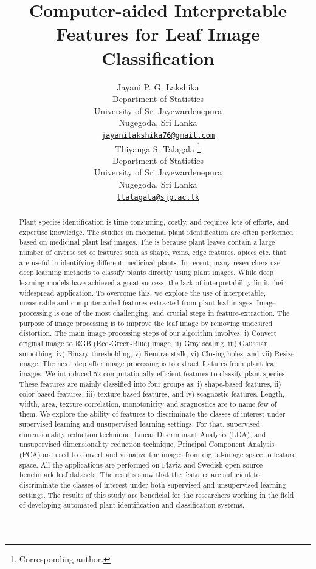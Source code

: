 \documentclass{article}
\title{Computer-aided Interpretable Features for Leaf Image
Classification}
\author{
    Jayani P. G. Lakshika
   \\
    Department of Statistics \\
    University of Sri Jayewardenepura \\
  Nugegoda, Sri Lanka \\
  \texttt{\href{mailto:jayanilakshika76@gmail.com}{\nolinkurl{jayanilakshika76@gmail.com}}} \\
   \And
    Thiyanga S. Talagala
    \thanks{Corresponding author.}
   \\
    Department of Statistics \\
    University of Sri Jayewardenepura \\
  Nugegoda, Sri Lanka \\
  \texttt{\href{mailto:ttalagala@sjp.ac.lk}{\nolinkurl{ttalagala@sjp.ac.lk}}} \\
  }
\begin{document}
\maketitle

\def\tightlist{}


\begin{abstract}
Plant species identification is time consuming, costly, and requires
lots of efforts, and expertise knowledge. The studies on medicinal plant
identification are often performed based on medicinal plant leaf images.
The is because plant leaves contain a large number of diverse set of
features such as shape, veins, edge features, apices etc. that are
useful in identifying different medicinal plants. In recent, many
researchers use deep learning methods to classify plants directly using
plant images. While deep learning models have achieved a great success,
the lack of interpretability limit their widespread application. To
overcome this, we explore the use of interpretable, measurable and
computer-aided features extracted from plant leaf images. Image
processing is one of the most challenging, and crucial steps in
feature-extraction. The purpose of image processing is to improve the
leaf image by removing undesired distortion. The main image processing
steps of our algorithm involves: i) Convert original image to RGB
(Red-Green-Blue) image, ii) Gray scaling, iii) Gaussian smoothing, iv)
Binary thresholding, v) Remove stalk, vi) Closing holes, and vii) Resize
image. The next step after image processing is to extract features from
plant leaf images. We introduced 52 computationally efficient features
to classify plant species. These features are mainly classified into
four groups as: i) shape-based features, ii) color-based features, iii)
texture-based features, and iv) scagnostic features. Length, width,
area, texture correlation, monotonicity and scagnostics are to name few
of them. We explore the ability of features to discriminate the classes
of interest under supervised learning and unsupervised learning
settings. For that, supervised dimensionality reduction technique,
Linear Discriminant Analysis (LDA), and unsupervised dimensionality
reduction technique, Principal Component Analysis (PCA) are used to
convert and visualize the images from digital-image space to feature
space. All the applications are performed on Flavia and Swedish open
source benchmark leaf datasets. The results show that the features are
sufficient to discriminate the classes of interest under both supervised
and unsupervised learning settings. The results of this study are
beneficial for the researchers working in the field of developing
automated plant identification and classification systems.
\end{abstract}
\end{document}
